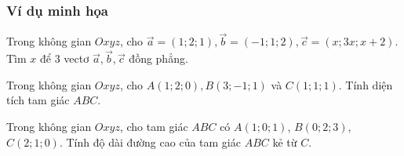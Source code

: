 \subsubsection{Ví dụ minh họa}
\begin{vd}%
	Trong không gian $ Oxyz $, cho $ \vec{a} = (1;2;1), \vec{b} = (-1;1;2), \vec{c} = (x;3x;x+2) $. Tìm $x$ để  $ 3 $ vectơ $ \vec{a}, \vec{b}, \vec{c} $ đồng phẳng.	
\end{vd}
\begin{vd}%
	Trong không gian $ Oxyz $, cho $ A(1;2;0), B(3;-1;1) $	và $ C(1;1;1) $. Tính diện tích tam giác $ ABC $.
\end{vd}
\begin{vd}%
	Trong không gian $Oxyz$, cho tam giác $ABC$ có $A\left(1;0;1\right)$, $B\left(0;2;3\right)$, $C\left(2;1;0\right)$. Tính độ dài đường cao của tam giác $ABC$ kẻ từ $C$.
\end{vd}



